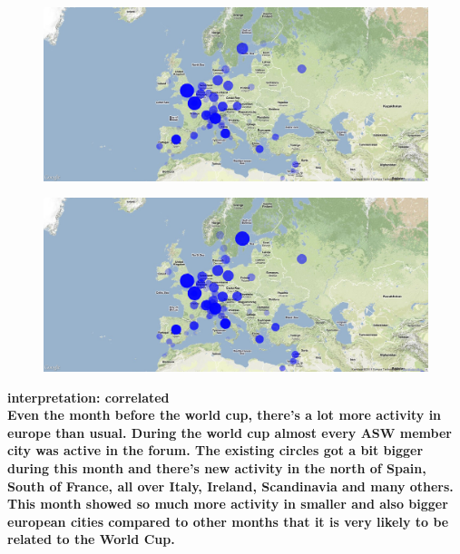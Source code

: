 \documentclass[11pt,a4paper,english]{article}
\begin{document}
\begin{itemize}
\begin{figure}[H]
  							\begin{center}
									\includegraphics[width=130mm]{img/pre-wcfinal}
									\vspace{-13pt}
								\end{center}
						\end{figure}
						\begin{figure}[H]
							\vspace{-13pt}
	  						\begin{center}
									\includegraphics[width=130mm]{img/post-wcfinal}
							\end{center}
							\vspace{-5pt}
						\end{figure}							
						\bf interpretation: \rm correlated
						\\ Even the month before the world cup, there's a lot more activity in europe than usual. During the world cup almost every ASW member city was active in the forum. The existing circles got a bit bigger during this month and there's new activity in the north of Spain, South of France, all over Italy, Ireland, Scandinavia and many others. This month showed so much more activity in smaller and also bigger european cities compared to other months that it is very likely to be related to the World Cup.
						
						
					

\end{itemize}
\end{document}
